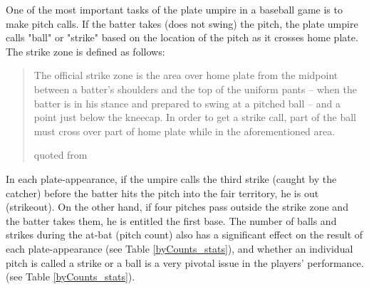 \documentclass[dvipdfmx, 12pt]{jsarticle}
\begin{document}
One of the most important tasks of the plate umpire in a baseball game is to make pitch calls. If the batter takes (does not swing) the pitch, the plate umpire calls "ball" or "strike" based on the location of the pitch as it crosses home plate. The strike zone is defined as follows:

\begin{quote}
  The official strike zone is the area over home plate from the midpoint between a batter's shoulders and the top of the uniform pants -- when the batter is in his stance and prepared to swing at a pitched ball -- and a point just below the kneecap. In order to get a strike call, part of the ball must cross over part of home plate while in the aforementioned area.
  \begin{flushright}
    quoted from \citet{official_strike_zone}
  \end{flushright}
\end{quote}

In each plate-appearance, if the umpire calls the third strike (caught by the catcher) before the batter hits the pitch into the fair territory, he is out (strikeout). On the other hand, if four pitches pass outside the strike zone and the batter takes them, he is entitled the first base. The number of balls and strikes during the at-bat (pitch count) also has a significant effect on the result of each plate-appearance (see Table \ref{byCounts_stats}), and whether an individual pitch is called a strike or a ball is a very pivotal issue in the players' performance. (see Table \ref{byCounts_stats}).

\begin{table}[ht]
    \centering
    \caption{wOBA by Pitch Counts}
    \label{byCounts_stats}
\end{table}
\end{document}
